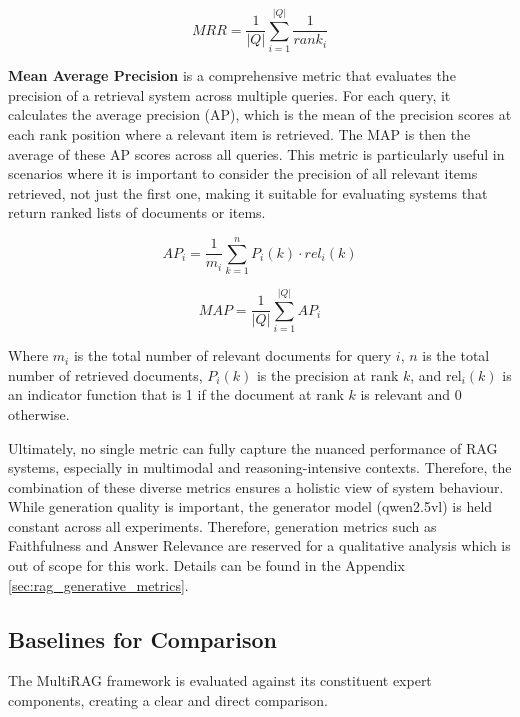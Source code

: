 \documentclass[12pt,twoside]{report}
\begin{document}
$$MRR=\frac{1}{|Q|}\sum_{i=1}^{|Q|}\frac{1}{rank_{i}}$$

\textbf{Mean Average Precision} is a comprehensive metric that evaluates the precision of a retrieval system across multiple queries. For each query, it calculates the average precision (AP), which is the mean of the precision scores at each rank position where a relevant item is retrieved. The MAP is then the average of these AP scores across all queries. This metric is particularly useful in scenarios where it is important to consider the precision of all relevant items retrieved, not just the first one, making it suitable for evaluating systems that return ranked lists of documents or items.

$$AP_{i}=\frac{1}{m_{i}}\sum_{k=1}^{n}P_{i}(k)\cdot rel_{i}(k)$$

$$MAP=\frac{1}{|Q|}\sum_{i=1}^{|Q|}AP_{i}$$

Where \( m_i \) is the total number of relevant documents for query \( i \), \( n \) is the total number of retrieved documents, \( P_i(k) \) is the precision at rank \( k \), and \( \text{rel}_i(k) \) is an indicator function that is 1 if the document at rank \( k \) is relevant and 0 otherwise.


Ultimately, no single metric can fully capture the nuanced performance of RAG systems, especially in multimodal and reasoning-intensive contexts. Therefore, the combination of these diverse metrics ensures a holistic view of system behaviour. While generation quality is important, the generator model (qwen2.5vl) is held constant across all experiments. Therefore, generation metrics such as Faithfulness and Answer Relevance are reserved for a qualitative analysis which is out of scope for this work. Details can be found in the Appendix \ref{sec:rag_generative_metrics}.

\subsection{Baselines for Comparison}

The MultiRAG framework is evaluated against its constituent expert components, creating a clear and direct comparison.
\end{document}
